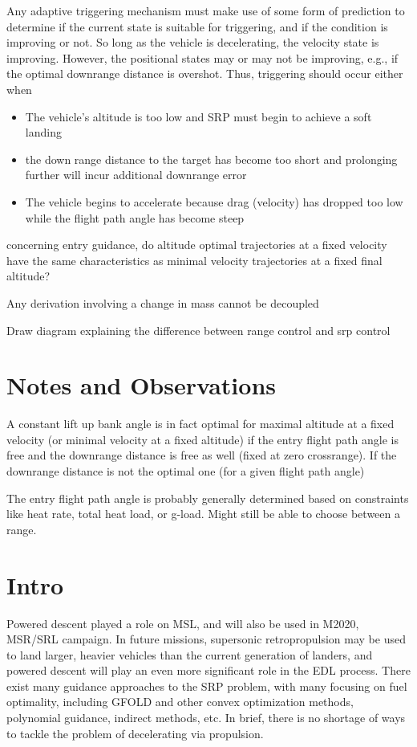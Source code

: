 \documentclass[]{article}
\begin{document}
Any adaptive triggering mechanism must make use of some form of prediction to determine if the current state is suitable for triggering, and if the condition is improving or not. So long as the vehicle is decelerating, the velocity state is improving. However, the positional states may or may not be improving, e.g., if the optimal downrange distance is overshot. Thus, triggering should occur either when 
\begin{itemize}
\item The vehicle's altitude is too low and SRP must begin to achieve a soft landing 
\item the down range distance to the target has become too short and prolonging further will incur additional downrange error
\item The vehicle begins to accelerate because drag (velocity) has dropped too low while the flight path angle has become steep 
\end{itemize}

concerning entry guidance, do altitude optimal trajectories at a fixed velocity have the same characteristics as minimal velocity trajectories at a fixed final altitude?

Any derivation involving a change in mass cannot be decoupled 


Draw diagram explaining the difference between range control and srp control


\section{Notes and Observations}
A constant lift up bank angle is in fact optimal for maximal altitude at a fixed velocity (or minimal velocity at a fixed altitude) if the entry flight path angle is free and the downrange distance is free as well (fixed at zero crossrange). If the downrange distance is not the optimal one (for a given flight path angle)

The entry flight path angle is probably generally determined based on constraints like heat rate, total heat load, or g-load. Might still be able to choose between a range. 
%

\section{Intro}
Powered descent played a role on MSL, and will also be used in M2020, MSR/SRL campaign. In future missions, supersonic retropropulsion may be used to land larger, heavier vehicles than the current generation of landers, and powered descent will play an even more significant role in the EDL process. There exist many guidance approaches to the SRP problem, with many focusing on fuel optimality, including GFOLD and other convex optimization methods, polynomial guidance, indirect methods, etc. In brief, there is no shortage of ways to tackle the problem of decelerating via propulsion. 
\end{document}
